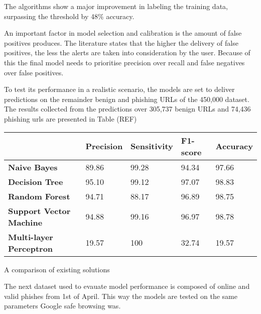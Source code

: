 The algorithms show a major improvement in labeling the training data, surpassing the threshold by 48\% accuracy. 

An important factor in model selection and calibration is the amount of false positives produces. The literature states that the higher the delivery of false positives, the less the alerts are taken into consideration by the user. Because of this the final model needs to prioritise precision over recall and false negatives over false positives.

To test its performance in a realistic scenario, the models are set to deliver predictions on the remainder benign and phishing URLs of the 450,000 dataset. The results collected from the predictions over 305,737 benign URLs and 74,436 phishing urls are presented in Table (REF)

\begin{singlespace}
	\small
	\begin{center}
		\label{tab:FIRST_TRAINED_MODELS}
		\begin{tabular}{ | m{8em} | m{13em} | m{8.5em} | m{2.3em} | m{5em} | }
			\hline
			                                & \textbf{Precision} &\textbf{Sensitivity} &\textbf{F1-score}& \textbf{Accuracy}  \\
			\hline
			\textbf{Naive Bayes}            & 89.86  & 99.28 & 94.34 &97.66        \\
			\hline
			\textbf{Decision Tree}          & 95.10 & 99.12 & 97.07 & 98.83        \\
			\hline
			\textbf{Random Forest}          & 94.71 & 88.17 & 96.89 & 98.75      \\
			\hline
			\textbf{Support Vector Machine} & 94.88 &99.16&96.97&98.78 \\
			\hline
			\textbf{Multi-layer Perceptron} & 19.57 & 100 & 32.74 & 19.57   \\
			\hline
		\end{tabular}
		\captionsetup{type=table}\caption{A comparison of existing solutions \citep{INTELLIGENT_PHISHING_ANFIS}}
	\end{center}
\end{singlespace}

 The next dataset used to evauate model performance is composed of online and valid phishes from 1st of April. This way the models are tested on the same parameters Google safe browsing was.

